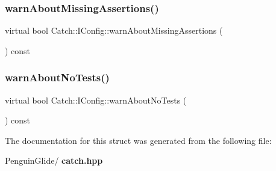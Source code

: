 \mbox{\label{struct_catch_1_1_i_config_a75d970c495a28e46b8e9b04a1d32149f}} 
\subsubsection{warnAboutMissingAssertions()}
{\footnotesize\ttfamily virtual bool Catch\+::\+I\+Config\+::warn\+About\+Missing\+Assertions (\begin{DoxyParamCaption}{ }\end{DoxyParamCaption}) const\hspace{0.3cm}{\ttfamily [pure virtual]}}

\mbox{\label{struct_catch_1_1_i_config_a30590623e3918825f2896c2262bf6fe3}} 
\subsubsection{warnAboutNoTests()}
{\footnotesize\ttfamily virtual bool Catch\+::\+I\+Config\+::warn\+About\+No\+Tests (\begin{DoxyParamCaption}{ }\end{DoxyParamCaption}) const\hspace{0.3cm}{\ttfamily [pure virtual]}}



The documentation for this struct was generated from the following file\+:\begin{DoxyCompactItemize}
\item 
Penguin\+Glide/\textbf{ catch.\+hpp}\end{DoxyCompactItemize}
